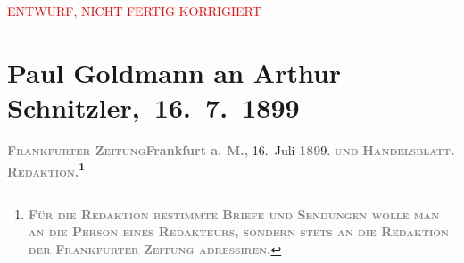
\begin{center}
            \textcolor{red}{ENTWURF, NICHT FERTIG KORRIGIERT}
                      \end{center}
            
         
         \renewcommand{\erwaehntePersonen}{Personen: Richard Beer-Hofmann, Hermann Hettner, Fedor Mamroth}
         \renewcommand{\erwaehnteInstitutionen}{Institutionen: Frankfurter Zeitung, Friedrich Vieweg und Sohn}
         \renewcommand{\erwaehnteOrte}{Orte: Bayreuth, Braunschweig, Florenz, Frankfurt am Main, Italien, Rennes, Rom, Slawonien, Velden am Wörthersee, Wien}
         \renewcommand{\erwaehnteWerke}{Werke: Ein Sommer in China. Reisebilder, Geschichte der französischen Literatur im achtzehnten Jahrhundert}
               \section[ Paul Goldmann an Arthur Schnitzler, 16. 7. 1899]{ Paul Goldmann an Arthur Schnitzler, 16. 7. 1899}\nopagebreak{}\rehead{ }\begin{ledgroupsized}[t]{13cm}\normalsize\beginnumbering \toendnotes[C]{\smallbreak\pagebreak[2]} 
\toendnotes[C]{\smallbreak}\pstart
           \noindent{}{\pb}\textcolor{gray}{\textbf{\textsc{Frankfurter Zeitung}}}\hfill \textcolor{gray}{\textbf{Frankfurt a. M.,}}{ }16. Juli \textcolor{gray}{\textbf{189}}9.\pend
           \pstart
           \textsc{\textcolor{gray}{\textbf{und}}}\pend
           \pstart
           \textcolor{gray}{\textbf{\textsc{Handelsblatt.}}}\pend
           \pstart
           \textcolor{gray}{\textbf{\textsc{Redaktion.\footnote{\noindent{}\textcolor{gray}{\textbf{\textsc{Für die Redaktion beſtimmte Briefe und Sendungen
                                    wolle man  an die Perſon eines
                                    Redakteurs, ſondern ſtets \textbf{an die Redaktion der
                                          Frankfurter Zeitung} adreſſiren.}}}}}}}\pend

\end{ledgroupsized}

